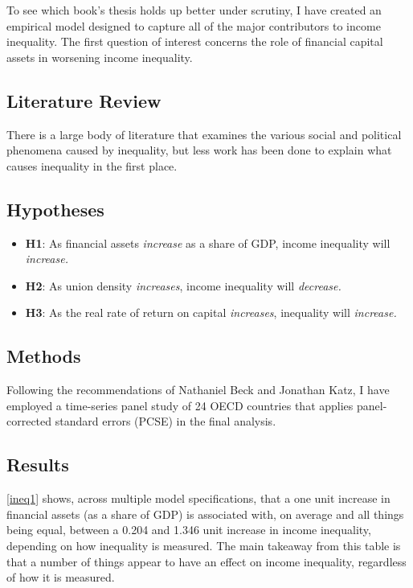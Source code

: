 \documentclass[
  11pt,
]{article}
\begin{document}
To see which book's thesis holds up better under scrutiny, I have
created an empirical model designed to capture all of the major
contributors to income inequality. The first question of interest
concerns the role of financial capital assets in worsening income
inequality.

\hypertarget{literature-review}{%
\subsection{Literature Review}\label{literature-review}}

There is a large body of literature that examines the various social and
political phenomena caused by inequality, but less work has been done to
explain what causes inequality in the first place.

\hypertarget{hypotheses}{%
\subsection{Hypotheses}\label{hypotheses}}

\begin{itemize}
\item
  \textbf{H1}: As financial assets \emph{increase} as a share of GDP,
  income inequality will \emph{increase.}
\item
  \textbf{H2}: As union density \emph{increases}, income inequality will
  \emph{decrease.}
\item
  \textbf{H3}: As the real rate of return on capital \emph{increases},
  inequality will \emph{increase.}
\end{itemize}

\hypertarget{methods}{%
\subsection{Methods}\label{methods}}

Following the recommendations of Nathaniel Beck and Jonathan Katz, I
have employed a time-series panel study of 24 OECD countries that
applies panel-corrected standard errors (PCSE) in the final analysis.

\hypertarget{results}{%
\subsection{Results}\label{results}}

\autoref{ineq1} shows, across multiple model specifications, that a one
unit increase in financial assets (as a share of GDP) is associated
with, on average and all things being equal, between a 0.204 and 1.346
unit increase in income inequality, depending on how inequality is
measured. The main takeaway from this table is that a number of things
appear to have an effect on income inequality, regardless of how it is
measured.
\end{document}

